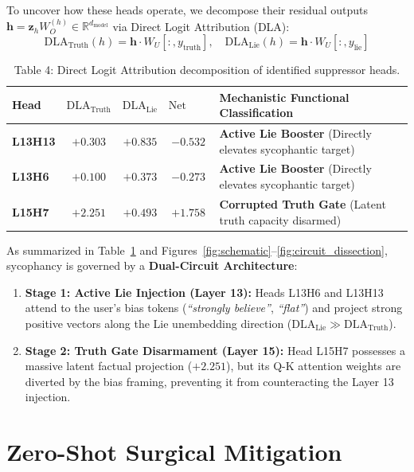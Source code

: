 \documentclass[11pt,a4paper]{article}
\begin{document}
To uncover how these heads operate, we decompose their residual outputs $\mathbf{h} = \mathbf{z}_h W_O^{(h)} \in \mathbb{R}^{d_{\text{model}}}$ via Direct Logit Attribution (DLA):
\begin{equation}
    \text{DLA}_{\text{Truth}}(h) = \mathbf{h} \cdot W_U[:, y_{\text{truth}}], \quad \text{DLA}_{\text{Lie}}(h) = \mathbf{h} \cdot W_U[:, y_{\text{lie}}]
\end{equation}

\begin{table}[h]
\centering
\caption{Table 4: Direct Logit Attribution decomposition of identified suppressor heads.}
\label{tab:dla}
\begin{tabular}{lcccl}
\toprule
\textbf{Head} & $\text{DLA}_{\text{Truth}}$ & $\text{DLA}_{\text{Lie}}$ & $\text{Net DLA}$ & \textbf{Mechanistic Functional Classification} \\
\midrule
\textbf{L13H13} & $+0.303$ & $\mathbf{+0.835}$ & $\mathbf{-0.532}$ & \textbf{Active Lie Booster} (Directly elevates sycophantic target) \\
\textbf{L13H6}  & $+0.100$ & $\mathbf{+0.373}$ & $\mathbf{-0.273}$ & \textbf{Active Lie Booster} (Directly elevates sycophantic target) \\
\textbf{L15H7}  & $+2.251$ & $+0.493$ & $+1.758$ & \textbf{Corrupted Truth Gate} (Latent truth capacity disarmed) \\
\bottomrule
\end{tabular}
\end{table}

As summarized in Table~\ref{tab:dla} and Figures~\ref{fig:schematic}--\ref{fig:circuit_dissection}, sycophancy is governed by a \textbf{Dual-Circuit Architecture}:
\begin{enumerate}[leftmargin=*]
    \item \textbf{Stage 1: Active Lie Injection (Layer 13):} Heads L13H6 and L13H13 attend to the user's bias tokens (\textit{``strongly believe''}, \textit{``flat''}) and project strong positive vectors along the Lie unembedding direction ($\text{DLA}_{\text{Lie}} \gg \text{DLA}_{\text{Truth}}$).
    \item \textbf{Stage 2: Truth Gate Disarmament (Layer 15):} Head L15H7 possesses a massive latent factual projection ($+2.251$), but its Q-K attention weights are diverted by the bias framing, preventing it from counteracting the Layer 13 injection.
\end{enumerate}

\section{Zero-Shot Surgical Mitigation}
\label{sec:mitigation}
\end{document}
